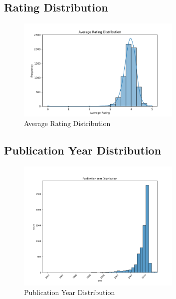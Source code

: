 \subsection{Rating Distribution}
\begin{figure}[H]
    \centering
    \includegraphics[width=0.7\textwidth]{figures/average_rating_distribution.png}
    \caption{Average Rating Distribution}
    \label{fig:rating-distribution}
\end{figure}

\subsection{Publication Year Distribution}
\begin{figure}[H]
    \centering
    \includegraphics[width=0.7\textwidth]{figures/publication_year_distribution.png}
    \caption{Publication Year Distribution}
    \label{fig:pubyear-distribution}
\end{figure}

